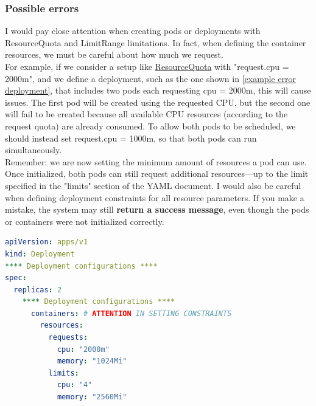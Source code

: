 \subsubsection{Possible errors}
\label{subsub:possible errors}
I would pay close attention when creating pods or deployments with ResourceQuota and LimitRange limitations. In fact, when defining the container resources, we must be careful about how much we request. \\
For example, if we consider a setup like \hyperref[lst:yaml_resourceQuotas_setup]{ResourceQuota} with "request.cpu = 2000m", and we define a deployment, such as the one shown in \autoref{example error deployment}, that includes two pods each requesting cpu = 2000m, this will cause issues. The first pod will be created using the requested CPU, but the second one will fail to be created because all available CPU resources (according to the request quota) are already consumed. To allow both pods to be scheduled, we should instead set request.cpu = 1000m, so that both pods can run simultaneously. \\
Remember: we are now setting the minimum amount of resources a pod can use.
Once initialized, both pods can still request additional resources—up to the limit specified in the "limits" section of the YAML document. I would also be careful when defining deployment constraints for all resource parameters.
If you make a mistake, the system may still \textbf{return a success message}, even though the pods or containers were not initialized correctly.
\begin{lstlisting}[language=yaml, caption={Deployment web application with team-a namespace}, label={example error deployment}]
apiVersion: apps/v1
kind: Deployment
**** Deployment configurations ****
spec:
  replicas: 2
    **** Deployment configurations ****
      containers: # ATTENTION IN SETTING CONSTRAINTS
        resources:
          requests:
            cpu: "2000m"
            memory: "1024Mi"
          limits:
            cpu: "4"
            memory: "2560Mi"
\end{lstlisting}
